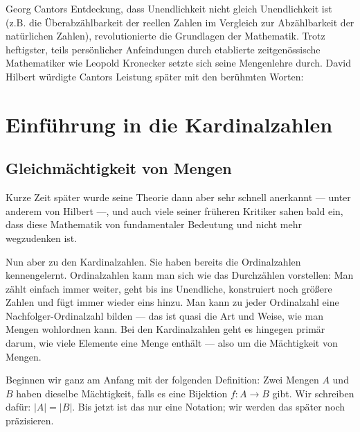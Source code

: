 \begin{didactic-insight}
Georg Cantors Entdeckung, dass Unendlichkeit nicht gleich Unendlichkeit ist (z.B. die Überabzählbarkeit der reellen Zahlen im Vergleich zur Abzählbarkeit der natürlichen Zahlen), revolutionierte die Grundlagen der Mathematik. Trotz heftigster, teils persönlicher Anfeindungen durch etablierte zeitgenössische Mathematiker wie Leopold Kronecker setzte sich seine Mengenlehre durch. David Hilbert würdigte Cantors Leistung später mit den berühmten Worten: 
\end{didactic-insight}

\section{Einführung in die Kardinalzahlen}

\subsection{Gleichmächtigkeit von Mengen}

\begin{spoken-clean}[00:15:23 - 00:17:00]
Kurze Zeit später wurde seine Theorie dann aber sehr schnell anerkannt --- unter anderem von Hilbert ---, und auch viele seiner früheren Kritiker sahen bald ein, dass diese Mathematik von fundamentaler Bedeutung und nicht mehr wegzudenken ist.

Nun aber zu den Kardinalzahlen. Sie haben bereits die Ordinalzahlen kennengelernt. Ordinalzahlen kann man sich wie das Durchzählen vorstellen: Man zählt einfach immer weiter, geht bis ins Unendliche, konstruiert noch größere Zahlen und fügt immer wieder eins hinzu. Man kann zu jeder Ordinalzahl eine Nachfolger-Ordinalzahl bilden --- das ist quasi die Art und Weise, wie man Mengen wohlordnen kann. Bei den Kardinalzahlen geht es hingegen primär darum, wie viele Elemente eine Menge enthält --- also um die Mächtigkeit von Mengen.

Beginnen wir ganz am Anfang mit der folgenden Definition: Zwei Mengen $A$ und $B$ haben dieselbe Mächtigkeit, falls es eine Bijektion $f \colon A \to B$ gibt. Wir schreiben dafür: $|A| = |B|$. Bis jetzt ist das nur eine Notation; wir werden das später noch präzisieren.
\end{spoken-clean}

